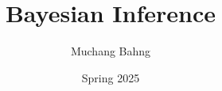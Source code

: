 \documentclass{article}
\begin{document}
\title{Bayesian Inference}
\author{Muchang Bahng}
\date{Spring 2025}

\maketitle
\tableofcontents
\pagebreak

 
 
 

 



\end{document}
